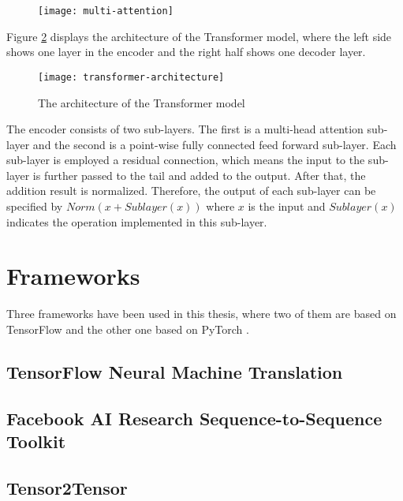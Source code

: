 \begin{figure}[h]
\texttt{[image: multi-attention]}
\centering
\caption{}
\label{figure:scaled dot-product attention}
\end{figure}

Figure \ref{figure:transformer model} displays the architecture of the Transformer model, where the left side shows one layer in the encoder and the right half shows one decoder layer.

\begin{figure}[h]
\texttt{[image: transformer-architecture]}
\centering
\caption{The architecture of the Transformer model \cite{Vaswani2017}}
\label{figure:transformer model}
\end{figure}

The encoder consists of two sub-layers. The first is a multi-head attention sub-layer and the second is a point-wise fully connected feed forward sub-layer. Each sub-layer is employed a residual connection, which means the input to the sub-layer is further passed to the tail and added to the output. After that, the addition result is normalized. Therefore, the output of each sub-layer can be specified by $ Norm(x+Sublayer(x)) $ where $ x $ is the input and $ Sublayer(x) $ indicates the operation implemented in this sub-layer.


\section{Frameworks}

Three frameworks have been used in this thesis, where two of them are based on TensorFlow \cite{tensorflow2015-whitepaper} and the other one based on PyTorch \cite{paszke2017automatic}.

\subsection{TensorFlow Neural Machine Translation}

\cite{luong17}

\subsection{Facebook AI Research Sequence-to-Sequence Toolkit}

\cite{gehring2017convs2s}

\subsection{Tensor2Tensor}

